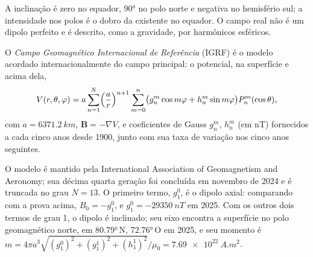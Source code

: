 A inclinação é zero no equador, \ang{90} no polo norte e
negativa no hemisfério sul; a intensidade nos polos é o dobro da existente no
equador. O campo real não é um dipolo perfeito e é descrito, como a gravidade,
por harmônicos esféricos.

\begin{definition}\label{def:b3:palaeomagnetism:igrf}
O \emph{Campo Geomagnético Internacional de Referência}
(IGRF) é o modelo acordado internacionalmente do
campo principal: o potencial, na superfície e acima dela,
\[
  V(r,\theta,\varphi) = a\sum_{n=1}^{N}\Bigl(\frac ar\Bigr)^{n+1}\sum_{m=0}^{n}
  \bigl(g_n^m\cos m\varphi + h_n^m\sin m\varphi\bigr)P_n^m(\cos\theta),
\]
com $a = \qty{6371.2}{km}$, $\mathbf B = -\nabla V$, e coeficientes de Gauss
$g_n^m$, $h_n^m$ (em \unit{nT}) fornecidos a cada cinco anos desde 1900, junto
com sua taxa de variação nos cinco anos seguintes.
\end{definition}

O modelo é mantido pela International Association of Geomagnetism and
Aeronomy; sua décima quarta geração foi concluída em novembro de 2024 e é
truncada no grau $N = 13$. O primeiro termo, $g_1^0$, é o dipolo axial:
comparando com a prova acima, $B_0 = -g_1^0$, e $g_1^0 = \qty{-29350}{nT}$
em 2025. Com os outros dois termos de grau 1, o dipolo é inclinado; seu eixo encontra
a superfície no polo geomagnético norte, em \ang{80.79}\,N, \ang{72.76}\,O em
2025, e seu momento é $m = 4\pi a^3\sqrt{(g_1^0)^2 + (g_1^1)^2 +
(h_1^1)^2}/\mu_0 = \qty{7.69e22}{A.m^2}$.

